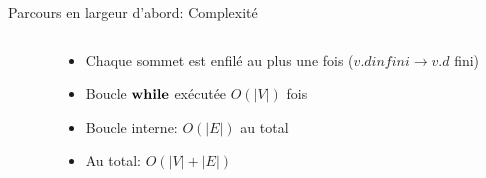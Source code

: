 \begin{frame}{Parcours en largeur d'abord: Complexité}

\begin{columns}
\begin{column}{6cm}
\begin{center}
{\small\vspace{-0.3cm}
}
\end{center}
\end{column}
\begin{column}{5cm}
\begin{itemize}
\item Chaque sommet est enfilé au plus une fois
  ($v.d infini \rightarrow v.d$ fini)
\item Boucle $\textbf{while}$ exécutée $O(|V|)$ fois
\item Boucle interne: $O(|E|)$ \alert{au total}
\item Au total: $O(|V|+|E|)$
\end{itemize}
\end{column}
\end{columns}

\end{frame}


